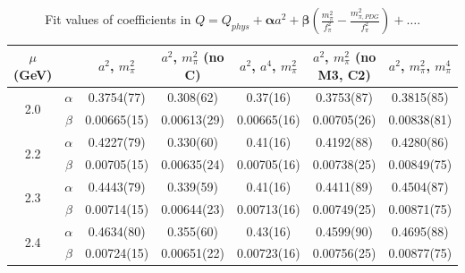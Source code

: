 \documentclass[12pt]{extarticle}
\begin{document}
\begin{table}[h!]
\begin{center}
\begin{tabular}{|c c|c|c|c|c|c|}
\hline
$\mu$ (GeV) &  & $a^2$, $m_\pi^2$& $a^2$, $m_\pi^2$ (no C)& $a^2$, $a^4$, $m_\pi^2$& $a^2$, $m_\pi^2$ (no M3, C2)& $a^2$, $m_\pi^2$, $m_\pi^4$\\
\hline
\multirow{2}{0.5in}{2.0} & $\alpha$ & 0.3754(77)& 0.308(62)& 0.37(16)& 0.3753(87)& 0.3815(85)\\
 & $\beta$ & 0.00665(15)& 0.00613(29)& 0.00665(16)& 0.00705(26)& 0.00838(81)\\
\hline
\multirow{2}{0.5in}{2.2} & $\alpha$ & 0.4227(79)& 0.330(60)& 0.41(16)& 0.4192(88)& 0.4280(86)\\
 & $\beta$ & 0.00705(15)& 0.00635(24)& 0.00705(16)& 0.00738(25)& 0.00849(75)\\
\hline
\multirow{2}{0.5in}{2.3} & $\alpha$ & 0.4443(79)& 0.339(59)& 0.41(16)& 0.4411(89)& 0.4504(87)\\
 & $\beta$ & 0.00714(15)& 0.00644(23)& 0.00713(16)& 0.00749(25)& 0.00871(75)\\
\hline
\multirow{2}{0.5in}{2.4} & $\alpha$ & 0.4634(80)& 0.355(60)& 0.43(16)& 0.4599(90)& 0.4695(88)\\
 & $\beta$ & 0.00724(15)& 0.00651(22)& 0.00723(16)& 0.00756(25)& 0.00877(75)\\
\hline
\end{tabular}
\caption{Fit values of coefficients in $Q = Q_{phys} + \mathbf{\alpha} a^2 + \mathbf{\beta}\left(\frac{m_\pi^2}{f_\pi^2}-\frac{m_{\pi,PDG}^2}{f_\pi^2}\right) + \ldots$.}
\end{center}
\end{table}




















\clearpage
\end{document}
